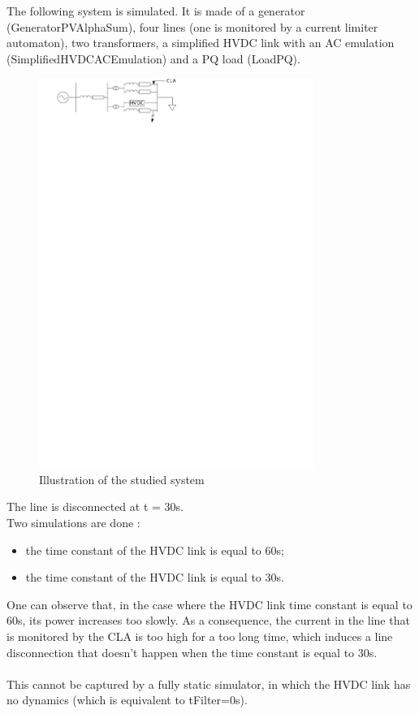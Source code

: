 \documentclass[a4paper, 12pt]{report}
\begin{document}
The following system is simulated. It is made of a generator (GeneratorPVAlphaSum), four lines (one is monitored by a current limiter automaton), two transformers, a simplified HVDC link with an AC emulation (SimplifiedHVDCACEmulation) and a PQ load (LoadPQ).\\

\begin{figure}[H]
  \begin{center}
  \includegraphics[width=0.8\textwidth]{HVDC_CLA/HVDC_CLA}
  \end{center}
  \caption{Illustration of the studied system}
\end{figure}

The line is disconnected at t = 30s.\\
Two simulations are done :
\begin{itemize}
\item the time constant of the HVDC link is equal to 60s;
\item the time constant of the HVDC link is equal to 30s.
\end{itemize}

One can observe that, in the case where the HVDC link time constant is equal to 60s, its power increases too slowly. As a consequence, the current in the line that is monitored by the CLA is too high for a too long time, which induces a line disconnection that doesn't happen when the time constant is equal to 30s.\\
\\
This cannot be captured by a fully static simulator, in which the HVDC link has no dynamics (which is equivalent to tFilter=0s).
\end{document}
